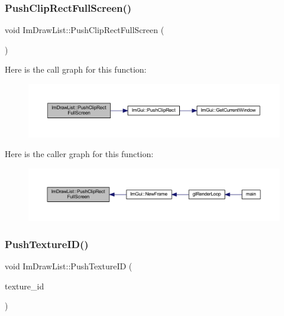 \mbox{\label{struct_im_draw_list_a0ab1ab409f0e269755e50a77901bae39}} 
\subsubsection{\texorpdfstring{Push\+Clip\+Rect\+Full\+Screen()}{PushClipRectFullScreen()}}
{\footnotesize\ttfamily void Im\+Draw\+List\+::\+Push\+Clip\+Rect\+Full\+Screen (\begin{DoxyParamCaption}{ }\end{DoxyParamCaption})}

Here is the call graph for this function\+:
\nopagebreak
\begin{figure}[H]
\begin{center}
\leavevmode
\includegraphics[width=350pt]{struct_im_draw_list_a0ab1ab409f0e269755e50a77901bae39_cgraph}
\end{center}
\end{figure}
Here is the caller graph for this function\+:
\nopagebreak
\begin{figure}[H]
\begin{center}
\leavevmode
\includegraphics[width=350pt]{struct_im_draw_list_a0ab1ab409f0e269755e50a77901bae39_icgraph}
\end{center}
\end{figure}
\mbox{\label{struct_im_draw_list_a7ac41e329a9df911b4823ef0150cee16}} 
\subsubsection{\texorpdfstring{Push\+Texture\+I\+D()}{PushTextureID()}}
{\footnotesize\ttfamily void Im\+Draw\+List\+::\+Push\+Texture\+ID (\begin{DoxyParamCaption}\item[{\mbox{\hyperlink{imgui_8h_a364f4447ecbc4ca176145ccff9db6286}{Im\+Texture\+ID}}}]{texture\+\_\+id }\end{DoxyParamCaption})}

